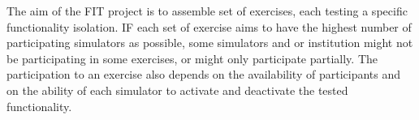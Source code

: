 The aim of the FIT project is to assemble set of exercises, each testing a specific functionality isolation.
IF each set of exercise aims to have the highest number of participating simulators as possible, some simulators and or institution might not be participating in some  exercises, or might only participate partially.
The participation to an exercise also depends on the availability of participants and on the ability of each simulator to activate and deactivate the tested functionality.
